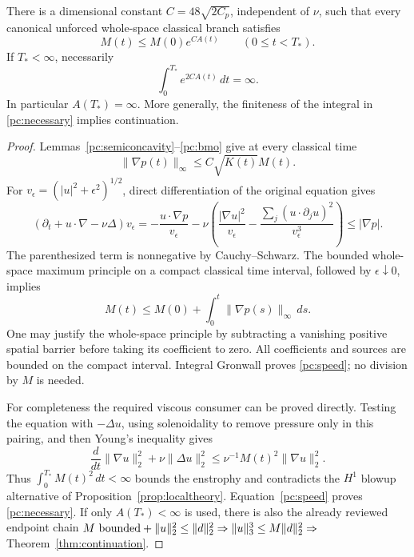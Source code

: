 \begin{theorem}
\label{pc:clock}
There is a dimensional constant $C=48\sqrt{2C_p}$, independent of $\nu$,
such that every canonical unforced whole-space classical branch satisfies
\begin{equation}\label{pc:speed}
 M(t)\le M(0)e^{CA(t)}\qquad(0\le t<T_*).
\end{equation}
If $T_*<\infty$, necessarily
\begin{equation}\label{pc:necessary}
 \int_0^{T_*}e^{2CA(t)}\,dt=\infty.
\end{equation}
In particular $A(T_*)=\infty$. More generally, the finiteness of the
integral in \eqref{pc:necessary} implies continuation.
\end{theorem}
\begin{proof}
Lemmas~\ref{pc:semiconcavity}--\ref{pc:bmo} give at every classical time
\[
 \|\nabla p(t)\|_\infty\le C\sqrt{K(t)}M(t).
\]
For $v_\epsilon=(|u|^2+\epsilon^2)^{1/2}$, direct differentiation of the
original equation gives
\[
 (\partial_t+u\cdot\nabla-\nu\Delta)v_\epsilon
 =-\frac{u\cdot\nabla p}{v_\epsilon}
 -\nu\left(\frac{|\nabla u|^2}{v_\epsilon}
       -\frac{\sum_j(u\cdot\partial_j u)^2}{v_\epsilon^3}\right)
 \le |\nabla p|.
\]
The parenthesized term is nonnegative by Cauchy--Schwarz. The bounded
whole-space maximum principle on a compact classical time interval,
followed by $\epsilon\downarrow0$, implies
\[
 M(t)\le M(0)+\int_0^t\|\nabla p(s)\|_\infty\,ds.
\]
One may justify the whole-space principle by subtracting a vanishing
positive spatial barrier before taking its coefficient to zero. All
coefficients and sources are bounded on the compact interval. Integral
Gronwall proves \eqref{pc:speed}; no division by $M$ is needed.

For completeness the required viscous consumer can be proved directly.
Testing the equation with $-\Delta u$, using solenoidality to remove
pressure only in this pairing, and then Young's inequality gives
\[
 \frac{d}{dt}\|\nabla u\|_2^2+\nu\|\Delta u\|_2^2
 \le \nu^{-1} M(t)^2\|\nabla u\|_2^2.
\]
Thus $\int_0^{T_*}M(t)^2\,dt<\infty$ bounds the enstrophy and
contradicts the $H^1$ blowup alternative of
Proposition~\ref{prop:localtheory}. Equation~\eqref{pc:speed} proves
\eqref{pc:necessary}. If only $A(T_*)<\infty$ is used, there is also the
already reviewed endpoint chain
$M\hbox{ bounded}+\|u\|_2^2\le\|d\|_2^2
\Rightarrow\|u\|_3^3\le M\|d\|_2^2
\Rightarrow$ Theorem~\ref{thm:continuation}.
\end{proof}

